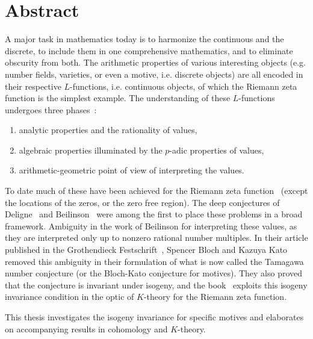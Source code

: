 
\chapter{Abstract}
\tab
A major task in mathematics today is to harmonize the continuous and the discrete, to include them in one comprehensive mathematics, and to eliminate obscurity from both.  The arithmetic properties of various interesting objects (e.g. number fields, varieties, or even a motive, i.e. discrete objects) are all encoded in their respective $L$-functions, i.e. continuous objects, of which the Riemann zeta function is the simplest example. The understanding of these $L$-functions undergoes three phases~\cite{Ka1993a}: 
\begin{enumerate}
\item
analytic properties and the rationality of values,
\item
algebraic properties illuminated by the $p$-adic properties of values,
\item
arithmetic-geometric point of view of interpreting the values. 
\end{enumerate}

To date much of these have been achieved for the Riemann zeta function~\cite{CRSS2015} (except the locations of the zeros, or the zero free region).  The deep conjectures of Deligne~\cite{De1979} and Beilinson~\cite{Be1985} were among the first to place these problems in a broad framework.  Ambiguity in the work of Beilinson for interpreting these values, as they are interpreted only up to nonzero rational number multiples.  In their article published in the Grothendieck Festschrift~\cite{BK1990}, Spencer Bloch and Kazuya Kato removed this ambiguity in their formulation of what is now called the Tamagawa number conjecture  (or the Bloch-Kato conjecture for motives).  They also proved that the conjecture is invariant under isogeny, and the book~\cite{CRSS2015} exploits this isogeny invariance condition in the optic of $K$-theory for the Riemann zeta function.

This thesis investigates the isogeny invariance for specific motives and elaborates on accompanying results in cohomology and $K$-theory.